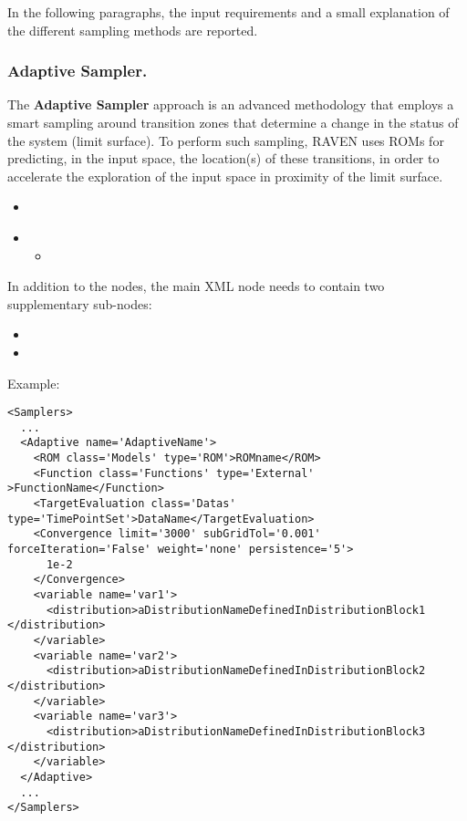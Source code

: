 In the following paragraphs, the input requirements and a small explanation of
the different sampling methods are reported.

\subsubsection{Adaptive Sampler.}
\label{subsubsubsec:AdaptiveSampling}
The \textbf{Adaptive Sampler} approach is an advanced methodology that employs
a smart sampling around transition zones that determine a change in the status
of the system (limit surface).
%
To perform such sampling, RAVEN uses ROMs for predicting, in the input space,
the location(s) of these transitions, in order to accelerate the exploration of
the input space in proximity of the limit surface.
%

%
\attrIntro

\begin{itemize}
  \itemsep0em
  \item \nameDescription
\end{itemize}


\begin{itemize}
  \item \variableDescription
    \variableChildIntro
    \begin{itemize}
      \item \distributionDescription
    \end{itemize}
\end{itemize}

In addition to the  nodes, the main XML node 
 needs to contain two supplementary sub-nodes:

\begin{itemize}
  \item \convergenceDescription

  \item \assemblerDescription

\end{itemize}

Example:
\begin{lstlisting}[style=XML,morekeywords={class,limit,subGridTol,weight,persistence}]
<Samplers>
  ...
  <Adaptive name='AdaptiveName'>
    <ROM class='Models' type='ROM'>ROMname</ROM>
    <Function class='Functions' type='External' >FunctionName</Function>
    <TargetEvaluation class='Datas' type='TimePointSet'>DataName</TargetEvaluation>
    <Convergence limit='3000' subGridTol='0.001' forceIteration='False' weight='none' persistence='5'>
      1e-2
    </Convergence>
    <variable name='var1'>
      <distribution>aDistributionNameDefinedInDistributionBlock1 </distribution> 
    </variable>
    <variable name='var2'>
      <distribution>aDistributionNameDefinedInDistributionBlock2 </distribution> 
    </variable>
    <variable name='var3'>
      <distribution>aDistributionNameDefinedInDistributionBlock3 </distribution> 
    </variable>
  </Adaptive>
  ...
</Samplers>
\end{lstlisting}

